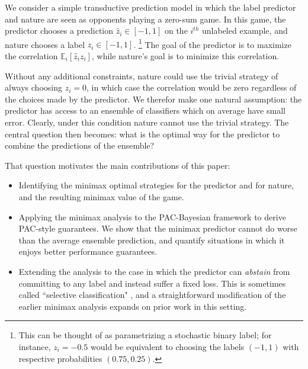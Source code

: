 \documentclass{article}[12pt]
\theoremstyle{named}
\newcommand{\evp}[2]{\mathbb{E}_{#2} \left[#1\right]} %
\begin{document}
We consider a simple transductive prediction model in which the label
predictor and nature are seen as opponents playing a zero-sum game.
In this game, the predictor chooses a prediction $\hat{z}_i \in
[-1,1]$ on the $i^{th}$ unlabeled example, and nature chooses a label
$z_i \in [-1,1]$.
\footnote{\label{ftnote:stochlabels} This can be thought of as parametrizing a stochastic binary label; 
for instance, $z_i = -0.5$ would be equivalent to choosing the labels $(-1,1)$ 
with respective probabilities $(0.75, 0.25)$.}
The goal of the predictor is to maximize the correlation $\evp{\hat{z}_i z_i}{i}$, 
while nature's goal is to minimize this correlation. 

Without any additional constraints, nature could use the trivial
strategy of always choosing $z_i = 0$, in which case the correlation
would be zero regardless of the choices made by the predictor. We
therefor make one natural assumption: the predictor has access to an
ensemble of classifiers which on average have small error.  Clearly,
under this condition nature cannot use the trivial strategy.  The
central question then becomes: what is the optimal way for the predictor
to combine the predictions of the ensemble?

That question motivates the main contributions of this paper:
\begin{itemize}
\item 
Identifying the minimax optimal strategies for the predictor and for nature, and the resulting minimax value of the game.
\item 
Applying the minimax analysis to the PAC-Bayesian framework to derive PAC-style guarantees. 
We show that the minimax predictor cannot do worse than the average ensemble prediction, 
and quantify situations in which it enjoys better performance guarantees.
\item 
Extending the analysis to the case in which the predictor can \emph{abstain} from committing to any label and instead suffer a fixed loss. 
This is sometimes called ``selective classification" \cite{EYW10}, 
and a straightforward modification of the earlier minimax analysis expands on prior work in this setting.
\end{itemize}
\end{document}
